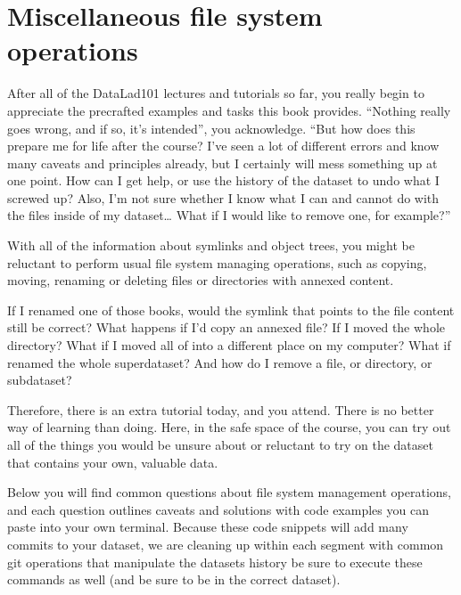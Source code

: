 \chapter{Miscellaneous file system operations}
\label{\detokenize{basics/101-136-filesystem:miscellaneous-file-system-operations}}\label{\detokenize{basics/101-136-filesystem:file-system}}\label{\detokenize{basics/101-136-filesystem::doc}}

\sphinxAtStartPar
After all of the DataLad\sphinxhyphen{}101 lectures and tutorials so far, you really begin to
appreciate the pre\sphinxhyphen{}crafted examples and tasks this book provides.
“Nothing really goes wrong, and if so, it’s intended”, you acknowledge.
“But how does this prepare me for life after the course? I’ve seen a lot of
different errors and know many caveats and principles already, but I certainly
will mess something up at one point. How can I get help, or use the history of
the dataset to undo what I screwed up? Also, I’m not sure whether I know what I
can and cannot do with the files inside of my dataset… What if I would
like to remove one, for example?”

\sphinxAtStartPar
With all of the information about symlinks and object trees,
you might be reluctant to perform usual file system managing
operations, such as copying, moving, renaming or deleting
files or directories with annexed content.

\sphinxAtStartPar
If I renamed one of those books, would the symlink that points
to the file content still be correct? What happens if I’d copy
an annexed file?
If I moved the whole  directory? What if I moved
all of  into a different place on my computer?
What if renamed the whole superdataset?
And how do I remove a file, or directory, or subdataset?

\sphinxAtStartPar
Therefore, there is an extra tutorial today, and you attend.
There is no better way of learning than doing. Here, in the
safe space of the  course, you can try out all
of the things you would be unsure about or reluctant to try
on the dataset that contains your own, valuable data.

\sphinxAtStartPar
Below you will find common questions about file system
management operations, and each question outlines caveats and
solutions with code examples you can paste into your own terminal.
Because these code snippets will add many commits to your
dataset, we are cleaning up within each segment with
common git operations that manipulate the datasets
history \textendash{} be sure to execute these commands as well (and
be sure to be in the correct dataset).


